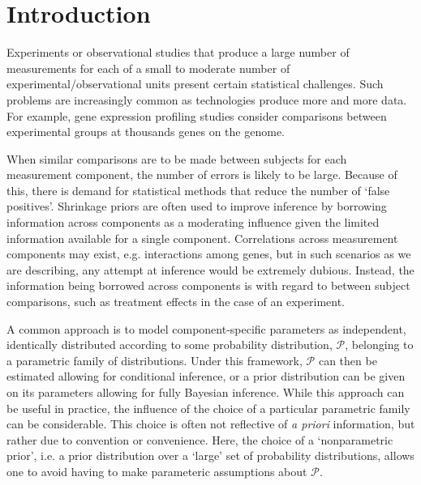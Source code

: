 \newcommand{\ind}{\stackrel{ind.}{\sim}}
\newcommand{\op}{\operatorname}
\newcommand{\code}{\texttt}

\section{Introduction}
Experiments or observational studies that produce a large number of measurements for each of a small to moderate number of experimental/observational units present certain statistical challenges. Such problems are increasingly common as technologies produce more and more data. For example, gene expression profiling studies consider comparisons between experimental groups at thousands genes on the genome.

When similar comparisons are to be made between subjects for each measurement component, the number of errors is likely to be large. Because of this, there is demand for statistical methods that reduce the number of `false positives'. Shrinkage priors are often used to improve inference by borrowing information across components as a moderating influence given the limited information available for a single component. Correlations across measurement components may exist, e.g. interactions among genes, but in such scenarios as we are describing, any attempt at inference would be extremely dubious. Instead, the information being borrowed across components is with regard to between subject comparisons, such as treatment effects in the case of an experiment.


A common approach is to model component-specific parameters as independent, identically distributed according to some probability distribution, $\mathcal{P}$, belonging to a parametric family of distributions. Under this framework, $\mathcal{P}$ can then be estimated allowing for conditional inference, or a prior distribution can be given on its parameters allowing for fully Bayesian inference. While this approach can be useful in practice, the influence of the choice of a particular parametric family can be considerable. This choice is often not reflective of \textit{a priori} information, but rather due to convention or convenience. Here, the choice of a `nonparametric prior', i.e. a prior distribution over a `large' set of probability distributions, allows one to avoid having to make parameteric assumptions about $\mathcal{P}$. 

